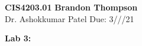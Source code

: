 \noindent
\textbf{CIS4203.01} \hfill \textbf{Brandon Thompson} \\
\normalsize Dr. Ashokkumar Patel \hfill Due: 3///21\\

\begin{center}
\textbf{Lab 3:}
\end{center}
